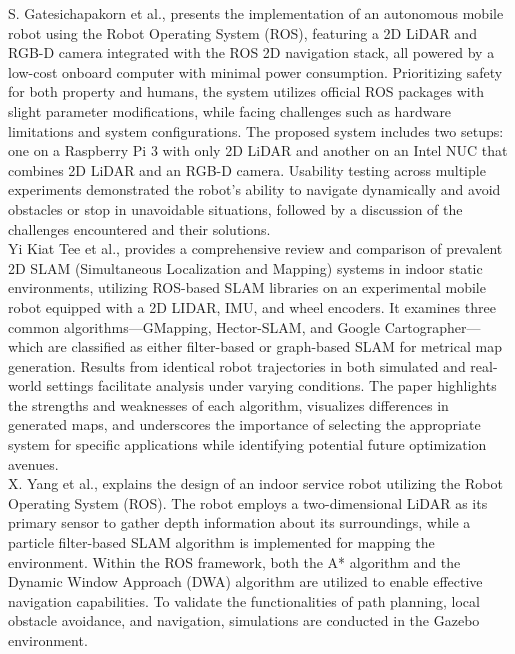 {		S. Gatesichapakorn et al., presents the implementation of an autonomous mobile robot using the Robot Operating System (ROS), featuring a 2D LiDAR and RGB-D camera integrated with the ROS 2D navigation stack, all powered by a low-cost onboard computer with minimal power consumption. Prioritizing safety for both property and humans, the system utilizes official ROS packages with slight parameter modifications, while facing challenges such as hardware limitations and system configurations. The proposed system includes two setups: one on a Raspberry Pi 3 with only 2D LiDAR and another on an Intel NUC that combines 2D LiDAR and an RGB-D camera. Usability testing across multiple experiments demonstrated the robot's ability to navigate dynamically and avoid obstacles or stop in unavoidable situations, followed by a discussion of the challenges encountered and their solutions. \cite{8645984}\\
		
		Yi Kiat Tee et al., provides a comprehensive review and comparison of prevalent 2D SLAM (Simultaneous Localization and Mapping) systems in indoor static environments, utilizing ROS-based SLAM libraries on an experimental mobile robot equipped with a 2D LIDAR, IMU, and wheel encoders. It examines three common algorithms—GMapping, Hector-SLAM, and Google Cartographer—which are classified as either filter-based or graph-based SLAM for metrical map generation. Results from identical robot trajectories in both simulated and real-world settings facilitate analysis under varying conditions. The paper highlights the strengths and weaknesses of each algorithm, visualizes differences in generated maps, and underscores the importance of selecting the appropriate system for specific applications while identifying potential future optimization avenues.\cite{9538731}\\
		
		X. Yang et al., explains the design of an indoor service robot utilizing the Robot Operating System (ROS). The robot employs a two-dimensional LiDAR as its primary sensor to gather depth information about its surroundings, while a particle filter-based SLAM algorithm is implemented for mapping the environment. Within the ROS framework, both the A* algorithm and the Dynamic Window Approach (DWA) algorithm are utilized to enable effective navigation capabilities. To validate the functionalities of path planning, local obstacle avoidance, and navigation, simulations are conducted in the Gazebo environment.  \cite{Yang_2021}\\
		
}
